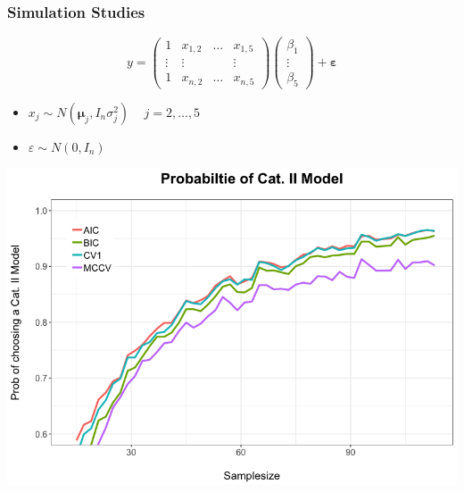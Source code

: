 \documentclass[20pt,mathserif,xcolor=dvipsnames]{beamer}
\begin{document}
\begin{frame}
\frametitle{Simulation Studies}
\begin{equation*}
y =\begin{pmatrix}
1 & x_{1,2} & \ldots & x_{1,5}\\
\vdots & \vdots& & \vdots\\
1& x_{n,2} &\ldots & x_{n,5}
\end{pmatrix}
\begin{pmatrix}
\beta_1\\
\vdots\\
\beta_5
\end{pmatrix}
+\mathbf{{\varepsilon}}
\end{equation*}
\begin{itemize}
	\item $x_{j} \sim N(\mathbf{{\mu}}_j,{I}_n\sigma^2_j)$ ~  $ j=2,\ldots,5$
	\item $\varepsilon \sim N(0,{I}_n)$
\end{itemize}
\end{frame}

\begin{frame}
\centering
\includegraphics[width=1.2\textheight]{ggplot_Simulation1.png}
\end{frame}
\end{document}
